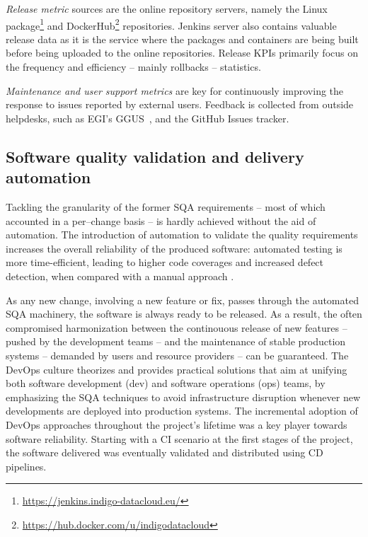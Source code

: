 \documentclass[journal]{IEEEtran}
\begin{document}
\textit{Release metric} sources are the online repository servers, namely the
Linux package\footnote{\url{https://jenkins.indigo-datacloud.eu/}}
and DockerHub\footnote{\url{https://hub.docker.com/u/indigodatacloud}} repositories. Jenkins
server also contains valuable release data as it is the service where the packages
and containers are being built before being uploaded to the online repositories. Release
KPIs primarily focus on the frequency and efficiency -- mainly rollbacks -- statistics.

\textit{Maintenance and user support metrics} are key for continuously improving the response
to issues reported by external users. Feedback is collected from outside helpdesks, such as
EGI's GGUS~\cite{ggus}, and the GitHub Issues tracker.

\subsection{Software quality validation and delivery automation}
\label{sec:devops}
Tackling the granularity of the former SQA requirements -- most of which accounted in a per--change basis --
is hardly achieved without the aid of automation. The introduction of automation to validate the quality
requirements increases the overall reliability of the produced software: automated testing is more 
time-efficient, leading to higher code coverages and increased defect detection, when compared with a manual
approach \cite{rafi2012}. 

As any new change, involving a new feature or fix, passes through the automated
SQA machinery, the software is always ready to be released. As a result, the often compromised harmonization
between the continouous release of new features -- pushed by the development teams -- and the maintenance of
stable production systems -- demanded by users and resource providers -- can be guaranteed. The DevOps culture
theorizes and provides practical solutions that aim at unifying both software development (dev) and software
operations (ops) teams, by emphasizing the SQA techniques to avoid infrastructure disruption whenever new
developments are deployed into production systems. 
The incremental adoption of DevOps approaches throughout the project's lifetime was a key player towards
software reliability. Starting with a CI scenario at the first stages of the project, the software delivered
was eventually validated and distributed using CD pipelines. 
\end{document}
